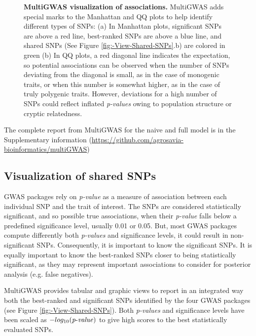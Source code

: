 \documentclass{article}
\begin{document}
\begin{figure}[H]
\caption{\scriptsize\textbf{MultiGWAS visualization of associations.} MultiGWAS adds special marks to the Manhattan and QQ plots to help identify different types of SNPs: (a) In Manhattan plots, significant SNPs are above a red line, best-ranked SNPs are above a blue line, and shared SNPs (See Figure \ref{fig:-View-Shared-SNPs}.b) are colored in green (b) In QQ plots, a red diagonal line indicates the expectation, so potential associations can be observed when the number of SNPs deviating from the diagonal is small, as in the case of monogenic traits, or when this number is somewhat higher, as in the case of truly polygenic traits. However, deviations for a high number of SNPs could reflect inflated \emph{p-values }owing to population structure or cryptic relatedness. \label{fig:view-qqmanhattan}}
\end{figure}


The complete report from MultiGWAS for the naive and full model is in the Supplementary information (\href{https://github.com/agrosavia-bioinformatics/multiGWAS}{https://github.com/agrosavia-bioinformatics/multiGWAS}) 




\subsection{Visualization of shared SNPs}
GWAS packages rely on \emph{p-value }as a measure of association between each individual SNP and the trait of interest. The SNPs are considered statistically significant, and so possible true associations, when their \emph{p-value }falls below a predefined significance level, usually 0.01 or 0.05. But, most GWAS packages compute differently both \emph{p-values }and significance levels, it could result in non-significant SNPs. Consequently, it is important to know the significant SNPs. It is equally important to know the best-ranked SNPs closer to being statistically significant, as they may represent important associations to consider for posterior analysis (e.g. false negatives).

MultiGWAS provides tabular and graphic views to report in an integrated way both the best-ranked and significant SNPs identified by the four GWAS packages (see Figure \ref{fig:-View-Shared-SNPs}). Both \emph{p-values} and significance levels have been scaled as $-log_{10}({\operatorname{\mathit{p-value}}})$ to give high scores to the best statistically evaluated SNPs.
\end{document}

